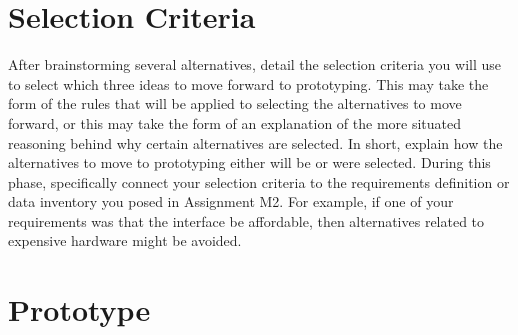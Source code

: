 \section{Selection Criteria}
After brainstorming several alternatives, detail the selection criteria you will use to select which three ideas to move forward to prototyping. This may take the form of the rules that will be applied to selecting the alternatives to move forward, or this may take the form of an explanation of the more situated reasoning behind why certain alternatives are selected. In short, explain how the alternatives to move to prototyping either will be or were selected.
During this phase, specifically connect your selection criteria to the requirements definition or data inventory you posed in Assignment M2. For example, if one of your requirements was that the interface be affordable, then alternatives related to expensive hardware might be avoided.


\section{Prototype}

